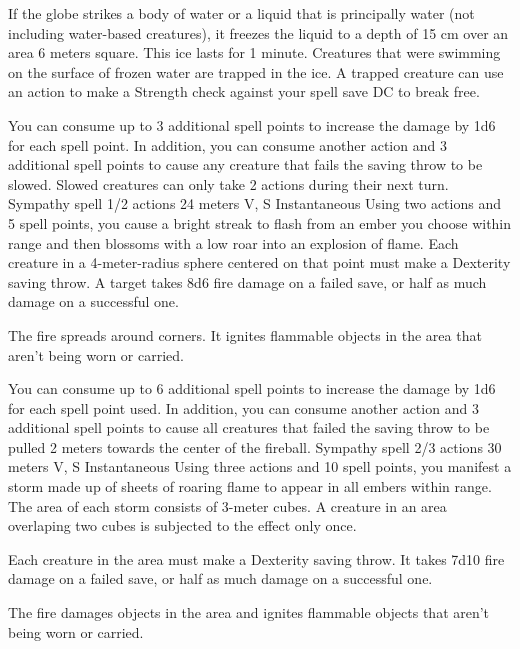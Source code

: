        If the globe strikes a body of water or a liquid that is principally water (not including water-based creatures), it freezes the liquid to a depth of 15 cm over an area 6 meters square.
        This ice lasts for 1 minute.
        Creatures that were swimming on the surface of frozen water are trapped in the ice.
        A trapped creature can use an action to make a Strength check against your spell save DC to break free.

        You can consume up to 3 additional spell points to increase the damage by 1d6 for each spell point.
        In addition, you can consume another action and 3 additional spell points to cause any creature that fails the saving throw to be slowed.
        Slowed creatures can only take 2 actions during their next turn.
        {Sympathy spell}
        {1/2 actions}
        {24 meters}
        {V, S}
        {Instantaneous}
        Using two actions and 5 spell points, you cause a bright streak to flash from an ember you choose within range and then blossoms with a low roar into an explosion of flame.
        Each creature in a 4-meter-radius sphere centered on that point must make a Dexterity saving throw.
        A target takes 8d6 fire damage on a failed save, or half as much damage on a successful one.

        The fire spreads around corners.
        It ignites flammable objects in the area that aren't being worn or carried.

        You can consume up to 6 additional spell points to increase the damage by 1d6 for each spell point used.
        In addition, you can consume another action and 3 additional spell points to cause all creatures that failed the saving throw to be pulled 2 meters towards the center of the fireball.
        {Sympathy spell}
        {2/3 actions}
        {30 meters}
        {V, S}
        {Instantaneous}
        Using three actions and 10 spell points, you manifest a storm made up of sheets of roaring flame to appear in all embers within range.
        The area of each storm consists of 3-meter cubes.
        A creature in an area overlaping two cubes is subjected to the effect only once.

        Each creature in the area must make a Dexterity saving throw.
        It takes 7d10 fire damage on a failed save, or half as much damage on a successful one.

        The fire damages objects in the area and ignites flammable objects that aren't being worn or carried.

